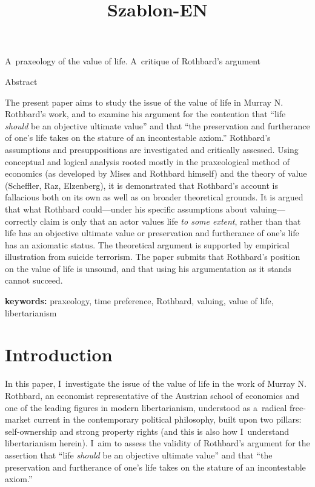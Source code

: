 \setcounter{secnumdepth}{2}









\title{Szablon-EN}



A~praxeology of the value of life. A~critique of Rothbard's argument





Abstract



The present paper aims to study the issue of the value of life in Murray N. Rothbard's work, and to examine his argument for the contention that ``life \textit{should} be an objective ultimate value'' and that ``the preservation and furtherance of one's life takes on the stature of an incontestable axiom.'' Rothbard's assumptions and presuppositions are investigated and critically assessed. Using conceptual and logical analysis rooted mostly in the praxeological method of economics (as developed by Mises and Rothbard himself) and the theory of value (Scheffler, Raz, Elzenberg), it is demonstrated that Rothbard's account is fallacious both on its own as well as on broader theoretical grounds. It is argued that what Rothbard could---under his specific assumptions about valuing---correctly claim is only that an actor values life \textit{to some extent}, rather than that life has an objective ultimate value or preservation and furtherance of one's life has an axiomatic status. The theoretical argument is supported by empirical illustration from suicide terrorism. The paper submits that Rothbard's position on the value of life is unsound, and that using his argumentation as it stands cannot succeed.



\textbf{keywords:} praxeology, time preference, Rothbard, valuing, value of life, libertarianism



\section{Introduction}

In this paper, I~investigate the issue of the value of life in the work of Murray N. Rothbard, an economist representative of the Austrian school of economics and one of the leading figures in modern libertarianism, understood as a~radical free-market current in the contemporary political philosophy, built upon two pillars: self-ownership and strong property rights 
\parencites[see][]{}[][]{} %
 (and this is also how I~understand libertarianism herein). I~aim to assess the validity of Rothbard's 
\parencite*[][pp.32–33]{} %
 argument for the assertion that ``life \textit{should} be an objective ultimate value'' and that ``the preservation and furtherance of one's life takes on the stature of an incontestable axiom.''



